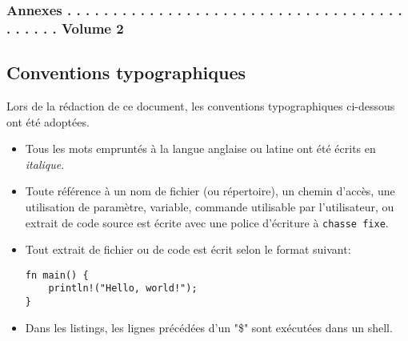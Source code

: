 \documentclass[a4paper, 12pt]{article}
\newenvironment{code}{\captionsetup{type=listing}}{}
\begin{document}

\newpage


\newpage


\newpage


\newpage

\tableofcontents
\subsubsection*{Annexes . . . . . . . . . . . . . . . . . . . . . . . . . . . . . . . . . . . . . . . . . . . Volume 2}
\newpage
{}
\listoffigures
\newpage
\renewcommand{\listtablename}{Table des tables}
\listoftables
\newpage
\renewcommand\listoflistingscaption{Table des listings de code source}
\listoflistings
\newpage

\subsection*{Conventions typographiques} %
Lors de la rédaction de ce document, les conventions typographiques ci-dessous ont
été adoptées.
\begin{itemize}[label=\textbullet]
	\item Tous les mots empruntés à la langue anglaise ou latine ont été écrits en \textit{italique}.
	\item Toute référence à un nom de fichier (ou répertoire), un chemin d'accès, une 
    utilisation de paramètre, variable, commande utilisable par l'utilisateur, ou extrait de code 
    source est écrite avec une police d'écriture à \texttt{chasse fixe}.
	\item Tout extrait de fichier ou de code est écrit selon le format suivant:
    \bigbreak
    \begin{code}
        \begin{verbatim}
fn main() {
    println!("Hello, world!");
}
        \end{verbatim}
    \end{code}
    \item Dans les listings, les lignes précédées d'un "\$" sont exécutées dans un shell.
\end{itemize}
\end{document}
